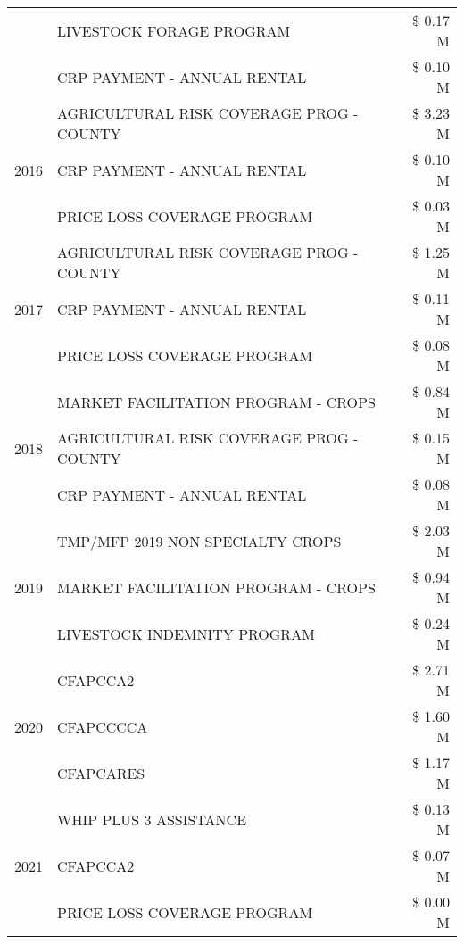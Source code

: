 \begin{tabular}{llr}
 & LIVESTOCK FORAGE PROGRAM & \$ 0.17 M \\
 & CRP PAYMENT - ANNUAL RENTAL & \$ 0.10 M \\
\cline{1-3}
\multirow[t]{3}{*}{2016} & AGRICULTURAL RISK COVERAGE PROG - COUNTY & \$ 3.23 M \\
 & CRP PAYMENT - ANNUAL RENTAL & \$ 0.10 M \\
 & PRICE LOSS COVERAGE PROGRAM & \$ 0.03 M \\
\cline{1-3}
\multirow[t]{3}{*}{2017} & AGRICULTURAL RISK COVERAGE PROG - COUNTY & \$ 1.25 M \\
 & CRP PAYMENT - ANNUAL RENTAL & \$ 0.11 M \\
 & PRICE LOSS COVERAGE PROGRAM & \$ 0.08 M \\
\cline{1-3}
\multirow[t]{3}{*}{2018} & MARKET FACILITATION PROGRAM - CROPS & \$ 0.84 M \\
 & AGRICULTURAL RISK COVERAGE PROG - COUNTY & \$ 0.15 M \\
 & CRP PAYMENT - ANNUAL RENTAL & \$ 0.08 M \\
\cline{1-3}
\multirow[t]{3}{*}{2019} & TMP/MFP 2019 NON SPECIALTY CROPS & \$ 2.03 M \\
 & MARKET FACILITATION PROGRAM - CROPS & \$ 0.94 M \\
 & LIVESTOCK INDEMNITY PROGRAM & \$ 0.24 M \\
\cline{1-3}
\multirow[t]{3}{*}{2020} & CFAPCCA2 & \$ 2.71 M \\
 & CFAPCCCCA & \$ 1.60 M \\
 & CFAPCARES & \$ 1.17 M \\
\cline{1-3}
\multirow[t]{3}{*}{2021} & WHIP PLUS 3 ASSISTANCE & \$ 0.13 M \\
 & CFAPCCA2 & \$ 0.07 M \\
 & PRICE LOSS COVERAGE PROGRAM & \$ 0.00 M \\
\cline{1-3}
\bottomrule
\end{tabular}
